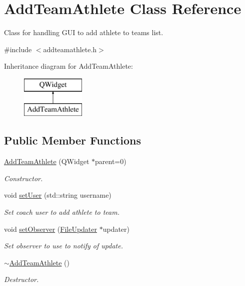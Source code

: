 \hypertarget{classAddTeamAthlete}{}\section{Add\+Team\+Athlete Class Reference}
\label{classAddTeamAthlete}


Class for handling G\+UI to add athlete to teams list.  




{\ttfamily \#include $<$addteamathlete.\+h$>$}

Inheritance diagram for Add\+Team\+Athlete\+:\begin{figure}[H]
\begin{center}
\leavevmode
\includegraphics[height=2.000000cm]{classAddTeamAthlete}
\end{center}
\end{figure}
\subsection*{Public Member Functions}
\begin{DoxyCompactItemize}
\item 
\mbox{\hyperlink{classAddTeamAthlete_a55728b5321f8db8631f815cb4a981606}{Add\+Team\+Athlete}} (Q\+Widget $\ast$parent=0)
\begin{DoxyCompactList}\small\item\em Constructor. \end{DoxyCompactList}\item 
void \mbox{\hyperlink{classAddTeamAthlete_a9282adf00e9e672c085976c1b496fdce}{set\+User}} (std\+::string username)
\begin{DoxyCompactList}\small\item\em Set coach user to add athlete to team. \end{DoxyCompactList}\item 
void \mbox{\hyperlink{classAddTeamAthlete_ac073711073bceacbcebe42d202aa019c}{set\+Observer}} (\mbox{\hyperlink{classFileUpdater}{File\+Updater}} $\ast$updater)
\begin{DoxyCompactList}\small\item\em Set observer to use to notify of update. \end{DoxyCompactList}\item 
\mbox{\hyperlink{classAddTeamAthlete_a8722b37d42c8cb95eca6a4de2ffd2a9c}{$\sim$\+Add\+Team\+Athlete}} ()
\begin{DoxyCompactList}\small\item\em Destructor. \end{DoxyCompactList}\end{DoxyCompactItemize}


